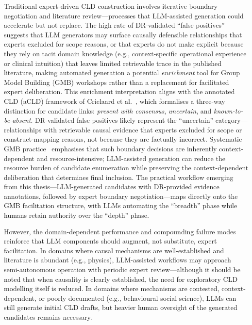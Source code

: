 Traditional expert-driven CLD construction involves iterative boundary negotiation and literature review---processes that LLM-assisted generation could accelerate but not replace. The high rate of DR-validated ``false positives'' suggests that LLM generators may surface causally defensible relationships that experts excluded for scope reasons, or that experts do not make explicit because they rely on tacit domain knowledge (e.g., context-specific operational experience or clinical intuition) that leaves limited retrievable trace in the published literature, making automated generation a potential \emph{enrichment} tool for Group Model Building (GMB) workshops rather than a replacement for facilitated expert deliberation. This enrichment interpretation aligns with the annotated CLD (aCLD) framework of Crielaard et al.~\citep{crielaard2024refining}, which formalises a three-way distinction for candidate links: \emph{present with consensus}, \emph{uncertain}, and \emph{known-to-be-absent}. DR-validated false positives likely represent the ``uncertain'' category---relationships with retrievable causal evidence that experts excluded for scope or construct-mapping reasons, not because they are factually incorrect. Systematic GMB practice~\citep{rouwette2002gmb_effectiveness} emphasises that such boundary decisions are inherently context-dependent and resource-intensive; LLM-assisted generation can reduce the resource burden of candidate enumeration while preserving the context-dependent deliberation that determines final inclusion. The practical workflow emerging from this thesis---LLM-generated candidates with DR-provided evidence annotations, followed by expert boundary negotiation---maps directly onto the GMB facilitation structure, with LLMs automating the ``breadth'' phase while humans retain authority over the ``depth'' phase.

However, the domain-dependent performance and compounding failure modes reinforce that LLM components should augment, not substitute, expert facilitation. In domains where causal mechanisms are well-established and literature is abundant (e.g., physics), LLM-assisted workflows may approach semi-autonomous operation with periodic expert review---although it should be noted that when causality is clearly established, the need for exploratory CLD modelling itself is reduced. In domains where mechanisms are contested, context-dependent, or poorly documented (e.g., behavioural social science), LLMs can still generate initial CLD drafts, but heavier human oversight of the generated candidates remains necessary.

